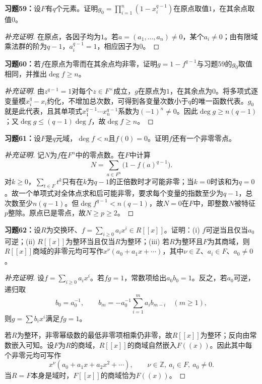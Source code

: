 \begin{problem}
\textbf{习题59：}设$F$有$q$个元素。证明$g_0=\prod_{i=1}^n(1-x_i^{q-1})$在原点取值$1$，在其余点取值$0$。
\end{problem}
\begin{proof}[补充证明]
在原点，各因子均为$1$。若$a=(a_1,\ldots,a_n)\ne0$，某个$a_i\ne0$；由有限域乘法群的阶为$q-1$，$a_i^{q-1}=1$，相应因子为$0$。
\end{proof}

\begin{problem}
\textbf{习题60：}若$f$在原点为零而在其余点均非零，证明$g=1-f^{q-1}$与习题59的$g_0$取值相同，并推出$\deg f\geqslant n$。
\end{problem}
\begin{proof}[补充证明]
由$z^{q-1}=1$对每个$z\in F^\times$成立，$g$在原点为$1$，在其余点为$0$。将多项式逐变量模$x_i^q-x_i$约化，不增加总次数，可得到各变量次数小于$q$的唯一函数代表。$g_0$就是此代表，且其单项式$x_1^{q-1}\cdots x_n^{q-1}$系数为$(-1)^n\ne0$。因此$\deg g\geqslant n(q-1)$；又$\deg g\leqslant(q-1)\deg f$，故$\deg f\geqslant n$。
\end{proof}

\begin{problem}
\textbf{习题61：}设$F$是$q$元域，$\deg f<n$且$f(0)=0$。证明$f$还有一个非零零点。
\end{problem}
\begin{proof}[补充证明]
记$N$为$f$在$F^n$中的零点数。在$F$中计算
\[
N=\sum_{a\in F^n}\bigl(1-f(a)^{q-1}\bigr).
\]
对$k\geqslant0$，$\sum_{t\in F}t^k$只有在$k$为$q-1$的正倍数时才可能非零；当$k=0$时该和为$q=0$。故一个单项式对全体点求和后可能非零，要求每个变量的指数至少为$q-1$，总次数至少$n(q-1)$。但$\deg f^{q-1}<n(q-1)$，故$N=0$在$F$中，即整数$N$被特征$p$整除。原点已是零点，故$N\geqslant p\geqslant2$。
\end{proof}

\begin{problem}
\textbf{习题62：}设$R$为交换环、$f=\sum_{i\geqslant0}a_ix^i\in R[[x]]$。证明：(i) $f$可逆当且仅当$a_0$可逆；(ii) $R[[x]]$为整环当且仅当$R$为整环；(iii) 若$R$为整环且$F$为其商域，则$R[[x]]$商域的非零元均可写作$x^\nu(a_0+a_1x+\cdots)$，其中$\nu\in\mathbb Z$、$a_i\in F$、$a_0\ne0$。
\end{problem}
\begin{proof}[补充证明]
设$f=\sum_{i\geqslant0}a_ix^i$。若$fg=1$，常数项给出$a_0b_0=1$。反之，若$a_0$可逆，递归取
\[
b_0=a_0^{-1},\qquad b_m=-a_0^{-1}\sum_{i=1}^m a_i b_{m-i}\quad(m\geqslant1),
\]
则$g=\sum b_ix^i$满足$fg=1$。

若$R$为整环，非零幂级数的最低非零项相乘仍非零，故$R[[x]]$为整环；反向由常数嵌入可知。设$F$为$R$的商域，$R[[x]]$的商域自然嵌入$F((x))$。因此其中每个非零元均可写作
\[
x^\nu(a_0+a_1x+a_2x^2+\cdots),\qquad \nu\in\mathbb Z,\ a_i\in F,\ a_0\ne0.
\]
当$R=F$本身是域时，$F[[x]]$的商域恰为$F((x))$。
\end{proof}

